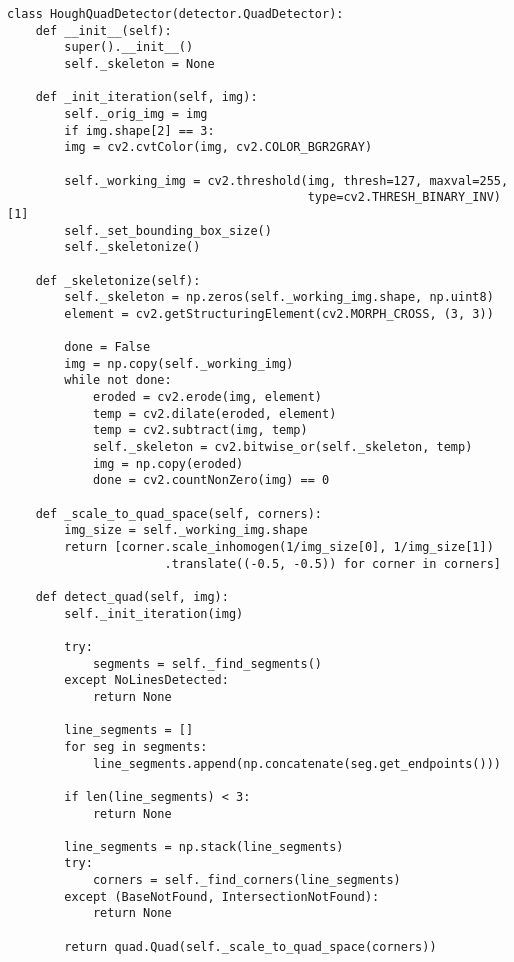 \begin{verbatim}
class HoughQuadDetector(detector.QuadDetector):
    def __init__(self):
        super().__init__()
        self._skeleton = None
        
    def _init_iteration(self, img):
        self._orig_img = img
        if img.shape[2] == 3:
        img = cv2.cvtColor(img, cv2.COLOR_BGR2GRAY)
        
        self._working_img = cv2.threshold(img, thresh=127, maxval=255, 
                                          type=cv2.THRESH_BINARY_INV)[1]
        self._set_bounding_box_size()
        self._skeletonize()
    
    def _skeletonize(self):
        self._skeleton = np.zeros(self._working_img.shape, np.uint8)
        element = cv2.getStructuringElement(cv2.MORPH_CROSS, (3, 3))
        
        done = False
        img = np.copy(self._working_img)
        while not done:
            eroded = cv2.erode(img, element)
            temp = cv2.dilate(eroded, element)
            temp = cv2.subtract(img, temp)
            self._skeleton = cv2.bitwise_or(self._skeleton, temp)
            img = np.copy(eroded)
            done = cv2.countNonZero(img) == 0
    
    def _scale_to_quad_space(self, corners):
        img_size = self._working_img.shape
        return [corner.scale_inhomogen(1/img_size[0], 1/img_size[1])
                      .translate((-0.5, -0.5)) for corner in corners]
    
    def detect_quad(self, img):
        self._init_iteration(img)
        
        try:
            segments = self._find_segments()
        except NoLinesDetected:
            return None
        
        line_segments = []
        for seg in segments:
            line_segments.append(np.concatenate(seg.get_endpoints()))
        
        if len(line_segments) < 3:
            return None
        
        line_segments = np.stack(line_segments)
        try:
            corners = self._find_corners(line_segments)
        except (BaseNotFound, IntersectionNotFound):
            return None
        
        return quad.Quad(self._scale_to_quad_space(corners))
\end{verbatim}

